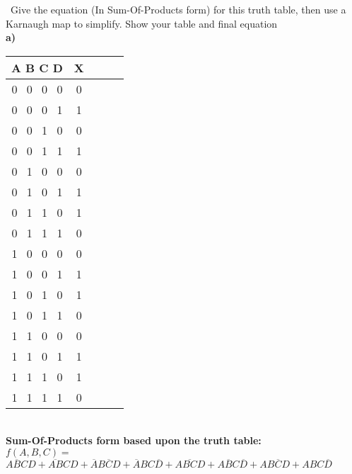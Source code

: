 \documentclass[12pt]{article}
\begin{document}
	
	
	
	
	
	
	
	\newpage
	
	
	
	
	
	
	
	
	
	\noindent {} 
	\ Give the equation (In Sum-Of-Products form) for this truth table, then use a Karnaugh map to simplify. Show your table and final equation \vspace{0.5cm} \\
	
	
	\textbf{a)}
	
	\begin{center}
		
		\begin{tabular}{ |c|c|c|c|c| } 
			\hline
			\textbf{A}  \textbf{B}  \textbf{C} \textbf{D} & \textbf{X}  \\
			\hline
			0 \ 0 \ 0 \ 0 & 0 \\
			0 \ 0 \ 0 \ 1 & 1 \\
			0 \ 0 \ 1 \ 0 & 0 \\
			0 \ 0 \ 1 \ 1 & 1 \\
			0 \ 1 \ 0 \ 0 & 0 \\
			0 \ 1 \ 0 \ 1 & 1 \\
			0 \ 1 \ 1 \ 0 & 1 \\
			0 \ 1 \ 1 \ 1 & 0 \\
			1 \ 0 \ 0 \ 0 & 0 \\
			1 \ 0 \ 0 \ 1 & 1 \\
			1 \ 0 \ 1 \ 0 & 1 \\
			1 \ 0 \ 1 \ 1 & 0 \\
			1 \ 1 \ 0 \ 0 & 0 \\
			1 \ 1 \ 0 \ 1 & 1 \\
			1 \ 1 \ 1 \ 0 & 1 \\
			1 \ 1 \ 1 \ 1 & 0 \\
			\hline
			
		\end{tabular} \vspace{0.6cm} \\
		
		\textbf{Sum-Of-Products form based upon the truth table: } \vspace{.2cm} \\
		$f(A, B, C) =$ \vspace{0.2cm}\\
		$\overline{ABC}D + \overline{AB}CD + \overline{A}B\overline{C}D + \overline{A}BC\overline{D} + A\overline{BC}D + A\overline{B}C\overline{D} + AB\overline{C}D + ABC\overline{D}$  \vspace{0.5cm} \\
		

\end{center}
\end{document}
